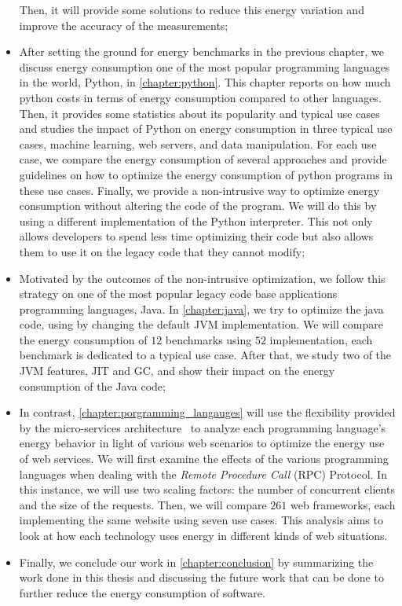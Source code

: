 \begin{itemize}
          Then, it will provide some solutions to reduce this energy variation and improve the accuracy of the measurements;
    \item After setting the ground for energy benchmarks in the previous chapter, we discuss energy consumption one of the most popular programming languages in the world, Python, in \cref{chapter:python}.
          This chapter reports on how much python costs in terms of energy consumption compared to other languages.
          Then, it provides some statistics about its popularity and typical use cases and studies the impact of Python on energy consumption in three typical use cases, machine learning, web servers, and data manipulation.
          For each use case, we compare the energy consumption of several approaches and provide guidelines on how to optimize the energy consumption of python programs in these use cases.
          Finally, we provide a non-intrusive way to optimize energy consumption without altering the code of the program.
          We will do this by using a different implementation of the Python interpreter.
          This not only allows developers to spend less time optimizing their code but also allows them to use it on the legacy code that they cannot modify;
    \item Motivated by the outcomes of the non-intrusive optimization, we follow this strategy on one of the most popular legacy code base applications programming languages, Java.
          In \cref{chapter:java}, we try to optimize the java code, using by changing the default JVM implementation.
          We will compare the energy consumption of $12$ benchmarks using $52$ implementation, each benchmark is dedicated to a typical use case.
          After that, we study two of the JVM features, JIT and GC, and show their impact on the energy consumption of the Java code;
    \item In contrast, \cref{chapter:porgramming_langauges} will use the flexibility provided by the micro-services architecture~\cite{dmitry2014micro} to analyze each programming language's energy behavior in light of various web scenarios to optimize the energy use of web services.
          We will first examine the effects of the various programming languages when dealing with the \emph{Remote Procedure Call} (RPC) Protocol.
          In this instance, we will use two scaling factors: the number of concurrent clients and the size of the requests. Then, we will compare $261$ web frameworks, each implementing the same website using seven use cases.
          This analysis aims to look at how each technology uses energy in different kinds of web situations.
    \item Finally, we conclude our work in \cref{chapter:conclusion} by summarizing the work done in this thesis and discussing the future work that can be done to further reduce the energy consumption of software.
\end{itemize}

